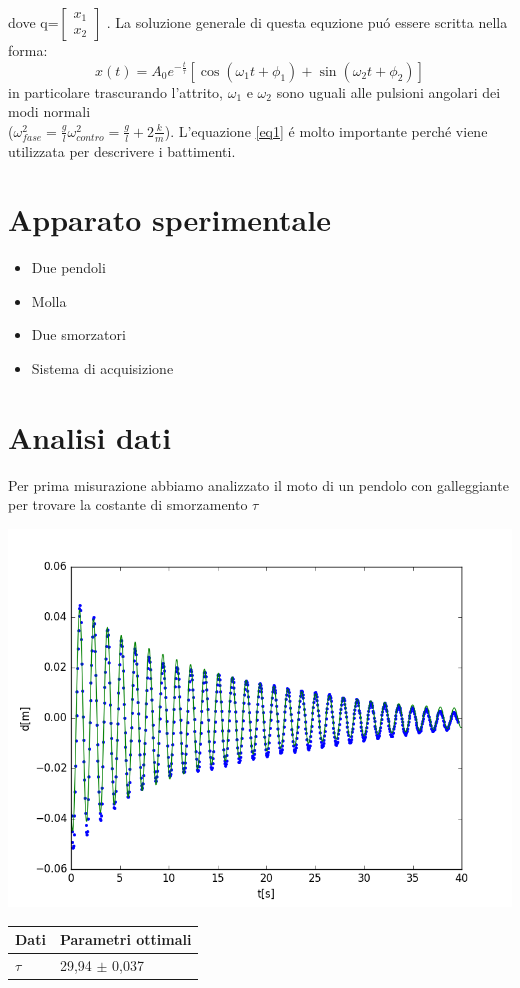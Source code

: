 \documentclass{exam}
\begin{document}
		dove q=$
		\begin{bmatrix}
			x_1 \\
			x_2
		\end{bmatrix}$
		. La soluzione generale di questa equzione pu\'o essere scritta nella forma:
		\begin{equation}
			\label{eq1}
			x(t)= A_0 e^{-\frac{t}{\tau}}[\cos(\omega_1 t + \phi_1) +\sin(\omega_2 t + \phi_2) ]
		\end{equation}
		in particolare trascurando l'attrito, $\omega_1$ e $\omega_2$ sono uguali alle pulsioni angolari dei modi normali\\($\omega_{fase}^2=\frac{g}{l} \omega_{contro}^2=\frac{g}{l}+2\frac{k}{m} $). L'equazione \ref{eq1} \'e molto importante perch\'e viene utilizzata per descrivere i battimenti.

	\section{Apparato sperimentale}
		\begin{itemize}
			\item Due pendoli
			\item Molla
			\item Due smorzatori
			\item Sistema di acquisizione
		\end{itemize}

	\section{Analisi dati}
		Per prima misurazione abbiamo analizzato il moto di un pendolo con galleggiante per trovare la costante di smorzamento $\tau$
	\begin{minipage}{0.5\textwidth}
		\includegraphics[width=\textwidth]{fit_smorzato}
		\end{minipage}
	\begin{minipage}{0.5\textwidth}
		\begin{tabular}{ll}
			\toprule
			Dati & Parametri ottimali \\
			\midrule
			$\tau$ & 29,94 $\pm$ 0,037
			\bottomrule

		\end{tabular}
	\end{minipage}
\end{document}
